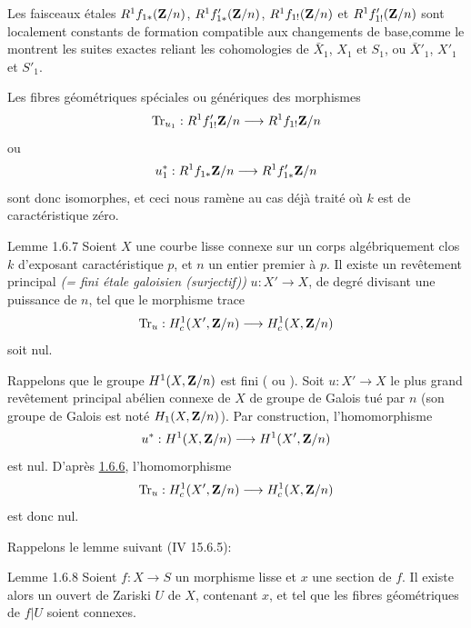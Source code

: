 \documentclass[10pt]{../fichiers-configuration-latex/smfart}
\begin{document}
Les faisceaux étales $R^{1}f_{1\ast}(\mathbf{Z}/n)$,
$R^{1}f'_{1\ast}(\mathbf{Z}/n)$, $R^{1}f_{1!}(\mathbf{Z}/n)$ et
$R^{1}f'_{1!}(\mathbf{Z}/n)$ sont localement constants de formation
compatible aux changements de base,\pageoriginale comme le montrent
les suites exactes reliant les cohomologies de $\bar{X}_{1}$, $X_{1}$
et $S_{1}$, ou $\bar{X}'_{1}$, $X'_{1}$ et $S'_{1}$.

Les fibres géométriques spéciales ou génériques des morphismes 
$$
\operatorname{Tr}_{u_{1}}:R^{1}f'_{1!}\mathbf{Z}/n\longrightarrow
R^{1}f_{1!}\mathbf{Z}/n
$$
ou
$$
u^{\ast}_{1}:R^{1}f_{1\ast}\mathbf{Z}/n\longrightarrow
R^{1}f'_{1\ast}\mathbf{Z}/n
$$
sont donc isomorphes, et ceci nous ramène au cas déjà traité où $k$
est de caractéristique zéro.

\begin{enonce*}{Lemme 1.6.7}
Soient $X$ une courbe lisse connexe sur un corps algébriquement clos
$k$ d'exposant caractéristique $p$, et $n$ un entier premier à $p$. Il
existe un revêtement principal \emph{(= fini étale galoisien
(surjectif))} $u:X'\rightarrow X$, de degré divisant une puissance de
$n$, tel que le morphisme trace
$$
\operatorname{Tr}_{u}:H^{1}_{c}(X', \mathbf{Z}/n)\longrightarrow
H^{1}_{c}(X,\mathbf{Z}/n)
$$
soit nul.
\end{enonce*}

Rappelons que le groupe $H^{1}(X,\mathbf{Z}/n)$ est fini ( ou
). Soit $u:X'\rightarrow X$ le plus grand revêtement principal
abélien connexe de $X$ de groupe de Galois tué par $n$ (son groupe de
Galois est noté $H_{1}(X,\mathbf{Z}/n)$). Par construction,
l'homomorphisme
$$
u^{\ast}:H^{1}(X,\mathbf{Z}/n)\longrightarrow H^{1}(X', \mathbf{Z}/n)
$$
est nul. D'après \hyperref[XVIII.lem1.6.6]{1.6.6}, l'homomorphisme
$$
\operatorname{Tr}_{u}:H^{1}_{c}(X',\mathbf{Z}/n)\longrightarrow
H^{1}_{c}(X,\mathbf{Z}/n)
$$
est donc nul.

Rappelons le lemme suivant (\EGA IV 15.6.5):

\begin{enonce*}{Lemme 1.6.8}
Soient $f:X\rightarrow S$ un morphisme lisse et $x$ une section de
$f$. Il existe alors un ouvert de Zariski $U$ de $X$, contenant $x$,
et tel que les fibres géométriques de $f|U$ soient connexes.
\end{enonce*}
\end{document}
